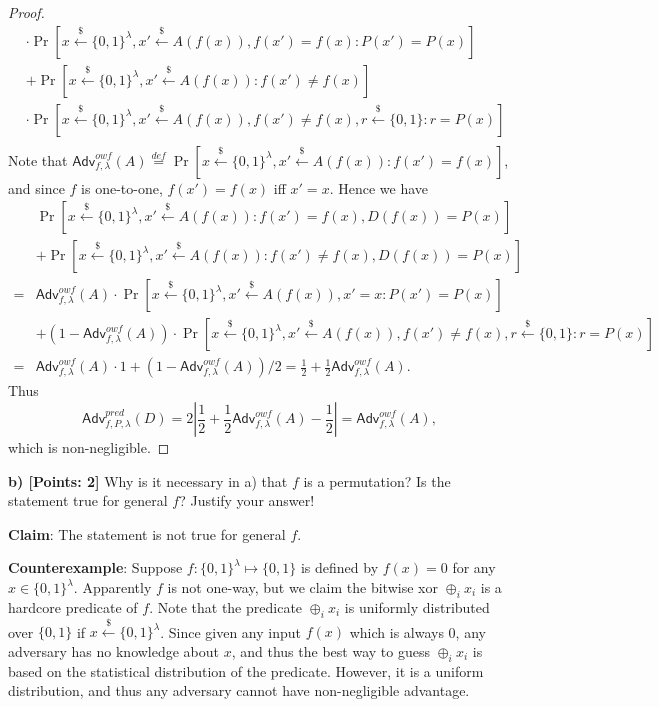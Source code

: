\documentclass[12pt]{article}
\newcommand{\eqdef}{\stackrel{def}{=}}
\newcommand{\bits}{\{0,1\}}
\newcommand{\getsr}{\stackrel{\$}{\gets}}
\newcommand{\Adv}{\textsf{Adv}}
\theoremstyle{definition}
\begin{document}
\begin{proof}
$$\begin{aligned}
&\cdot\Pr[x\getsr\bits^\lambda, x'\getsr A(f(x)), f(x')=f(x): P(x') = P(x)] \\
&+\Pr[x\getsr\bits^\lambda, x'\getsr A(f(x)) : f(x')\not=f(x)]\\
&\cdot\Pr[x\getsr\bits^\lambda, x'\getsr A(f(x)), f(x')\not=f(x), r\getsr\bits: r = P(x)] \\
\end{aligned}
$$
Note that $\Adv_{f,\lambda}^{owf}(A) \eqdef \Pr[x\getsr\bits^\lambda, x'\getsr A(f(x)) : f(x')=f(x)]$, and since $f$ is one-to-one, $f(x')=f(x)$ iff $x'=x$. Hence we have
$$
\begin{aligned}
&\Pr[x\getsr\bits^\lambda, x'\getsr A(f(x)) : f(x')=f(x), D(f(x)) = P(x)] \\
&+\Pr[x\getsr\bits^\lambda, x'\getsr A(f(x)) : f(x')\not=f(x), D(f(x)) = P(x)] \\
=&\Adv_{f,\lambda}^{owf}(A)\cdot\Pr[x\getsr\bits^\lambda, x'\getsr A(f(x)), x'=x: P(x') = P(x)] \\
&+(1-\Adv_{f,\lambda}^{owf}(A))\cdot\Pr[x\getsr\bits^\lambda, x'\getsr A(f(x)), f(x')\not=f(x), r\getsr\bits: r = P(x)] \\
=&\Adv_{f,\lambda}^{owf}(A)\cdot 1 + (1-\Adv_{f,\lambda}^{owf}(A))/2 = \frac{1}{2} + \frac{1}{2}\Adv_{f,\lambda}^{owf}(A).
\end{aligned}
$$
Thus
$$\Adv_{f,P,\lambda}^{pred}(D) = 2\left| \frac{1}{2} + \frac{1}{2}\Adv_{f,\lambda}^{owf}(A)-\frac{1}{2} \right| = \Adv_{f,\lambda}^{owf}(A),$$
which is non-negligible.
\end{proof}

{\bf b) [Points: 2]} Why is it necessary in a) that $f$ is a permutation? Is the statement true for
general $f$? Justify your answer!

{\bf Claim}: The statement is not true for general $f$.

{\bf Counterexample}: Suppose $f : \bits^\lambda \mapsto \bits$ is defined by $f(x) = 0$ for any $x\in\bits^\lambda$. Apparently $f$ is not one-way, but we claim the bitwise xor $\oplus_i x_i$ is a hardcore predicate of $f$. Note that the predicate $\oplus_i x_i$ is uniformly distributed over $\bits$ if $x\getsr\bits^\lambda$. Since given any input $f(x)$ which is always 0, any adversary has no knowledge about $x$, and thus the best way to guess $\oplus_i x_i$ is based on the statistical distribution of the predicate. However, it is a uniform distribution, and thus any adversary cannot have non-negligible advantage.
\end{document}
